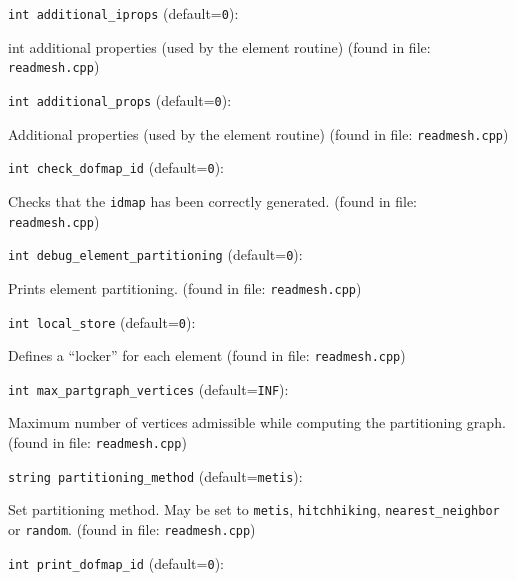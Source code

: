 \item\verb+int additional_iprops+ {\rm(default=\verb|0|)}:

int additional properties (used by the element routine)
 (found in file: \verb+readmesh.cpp+)
\item\verb+int additional_props+ {\rm(default=\verb|0|)}:

Additional properties (used by the element routine)
 (found in file: \verb+readmesh.cpp+)
\item\verb+int check_dofmap_id+ {\rm(default=\verb|0|)}:

Checks that the \verb+idmap+ has been correctly generated. 
 (found in file: \verb+readmesh.cpp+)
\item\verb+int debug_element_partitioning+ {\rm(default=\verb|0|)}:

Prints element partitioning. 
 (found in file: \verb+readmesh.cpp+)
\item\verb+int local_store+ {\rm(default=\verb|0|)}:

Defines a ``locker'' for each element
 (found in file: \verb+readmesh.cpp+)
\item\verb+int max_partgraph_vertices+ {\rm(default=\verb|INF|)}:

Maximum number of vertices admissible while computing the
partitioning graph.
 (found in file: \verb+readmesh.cpp+)
\item\verb+string partitioning_method+ {\rm(default=\verb|metis|)}:

Set partitioning method. May be set to \verb+metis+,
\verb+hitchhiking+, \verb+nearest_neighbor+ or \verb+random+.
 (found in file: \verb+readmesh.cpp+)
\item\verb+int print_dofmap_id+ {\rm(default=\verb|0|)}:

